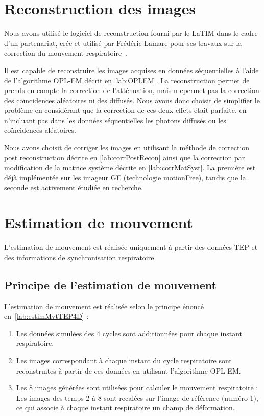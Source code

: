 
\section{Reconstruction des images}

Nous avons utilisé le logiciel de reconstruction fourni par le LaTIM dans le cadre d'un partenariat, crée et utilisé par Frédéric Lamare pour ses travaux sur la correction du mouvement respiratoire~\cite{lamare2007list}.

Il est capable de reconstruire les images acquises en données séquentielles à l'aide de l'algorithme OPL-EM décrit en \ref{lab:OPLEM}. La reconstruction permet de prends en compte la correction de l'atténuation, mais n epermet pas la correction des coïncidences aléatoires ni des diffusés. Nous avons donc choisit de simplifier le problème en considérant que la correction de ces deux effets était parfaite, en n'incluant pas dans les données séquentielles les photons diffusés ou les coïncidences aléatoires.

Nous avons choisit de corriger les images en utilisant la méthode de correction post reconstruction décrite en \ref{lab:corrPostRecon} ainsi que la correction par modification de la matrice système décrite en \ref{lab:corrMatSyst}. La première est déjà implémentée sur les imageur GE (technologie motionFree), tandis que la seconde est activement étudiée en recherche. 

\section{Estimation de mouvement}

L'estimation de mouvement est réalisée uniquement à partir des données TEP et des informations de synchronisation respiratoire. 

\subsection{Principe de l'estimation de mouvement}

L'estimation de mouvement est réalisée selon le principe énoncé en~\ref{lab:estimMvtTEP4D} :
\begin{enumerate}
 \item Les données simulées des 4 cycles sont additionnées pour chaque instant respiratoire.
 \item Les images correspondant à chaque instant du cycle respiratoire sont reconstruites à partir de ces données en utilisant l'algorithme OPL-EM.
 \item Les 8 images générées sont utilisées pour calculer le mouvement respiratoire : Les images des temps 2 à 8 sont recalées sur l'image de référence (numéro 1), ce qui associe à chaque instant respiratoire un champ de déformation.
\end{enumerate}

